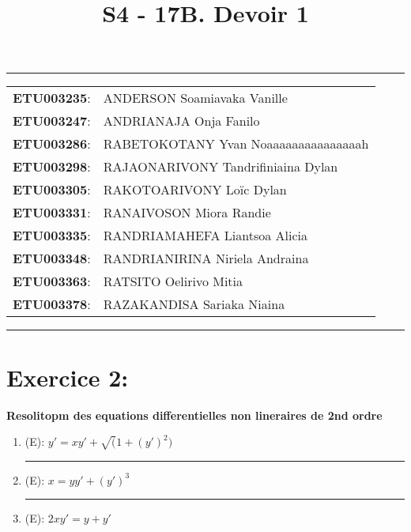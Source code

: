 \documentclass[a4paper,12pt]{article}
\begin{document}
	
\title{\textbf{S4 - 17B. Devoir 1}}
\date{}
\maketitle

\hrule
\vspace{1em}

\begin{tabular}{rl}
	\textbf{ETU003235}: & ANDERSON Soamiavaka Vanille \\
	\textbf{ETU003247}: & ANDRIANAJA Onja Fanilo \\
	\textbf{ETU003286}: & RABETOKOTANY Yvan Noaaaaaaaaaaaaaaah \\
	\textbf{ETU003298}: & RAJAONARIVONY Tandrifiniaina Dylan \\
	\textbf{ETU003305}: & RAKOTOARIVONY Loïc Dylan \\
	\textbf{ETU003331}: & RANAIVOSON Miora Randie \\
	\textbf{ETU003335}: & RANDRIAMAHEFA Liantsoa Alicia \\
	\textbf{ETU003348}: & RANDRIANIRINA Niriela Andraina \\
	\textbf{ETU003363}: & RATSITO Oelirivo Mitia \\
	\textbf{ETU003378}: & RAZAKANDISA Sariaka Niaina \\
\end{tabular}

\vspace{1em}
\hrule

\newpage
\section*{Exercice 2:}
\textbf{Resolitopm des equations differentielles non lineraires de 2nd ordre}

\begin{enumerate}
	\vspace{1cm}
	\item (E): $y' = xy' + \sqrt(1+(y')^2)$ \\
	
	
	\vspace{1cm}
	\hrule
	\vspace{1cm}

	\item (E): $x = yy' + (y')^3$ \\
	
	
	\vspace{1cm}
	\hrule
	\vspace{1cm}

	\item (E): $2xy' = y + y'$ \\
	
	\vspace{1cm}
	

\end{enumerate}
\end{document}
